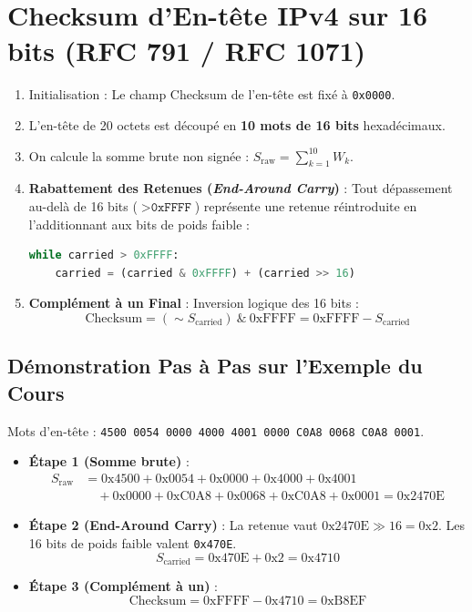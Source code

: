 \documentclass[11pt,a4paper]{report}
\begin{document}
\section{Checksum d'En-t\^ete IPv4 sur 16 bits (RFC 791 / RFC 1071)}
\begin{enumerate}
    \item Initialisation : Le champ Checksum de l'en-t\^ete est fix\'e \`a \texttt{0x0000}.
    \item L'en-t\^ete de 20 octets est d\'ecoup\'e en \textbf{10 mots de 16 bits} hexad\'ecimaux.
    \item On calcule la somme brute non sign\'ee : $S_{\text{raw}} = \sum_{k=1}^{10} W_k$.
    \item \textbf{Rabattement des Retenues (\textit{End-Around Carry})} : Tout d\'epassement au-del\`a de 16 bits ($> \texttt{0xFFFF}$) repr\'esente une retenue r\'eintroduite en l'additionnant aux bits de poids faible :
    \begin{lstlisting}[language=Python]
while carried > 0xFFFF:
    carried = (carried & 0xFFFF) + (carried >> 16)
    \end{lstlisting}
    \item \textbf{Compl\'ement \`a un Final} : Inversion logique des 16 bits :
    $$\text{Checksum} = (\sim S_{\text{carried}}) \ \& \ \text{0xFFFF} = \text{0xFFFF} - S_{\text{carried}}$$
\end{enumerate}

\subsection{D\'emonstration Pas \`a Pas sur l'Exemple du Cours}
Mots d'en-t\^ete : \texttt{4500 0054 0000 4000 4001 0000 C0A8 0068 C0A8 0001}.
\begin{itemize}
    \item \textbf{\'Etape 1 (Somme brute)} :
    \begin{align*}
        S_{\text{raw}} &= \text{0x4500} + \text{0x0054} + \text{0x0000} + \text{0x4000} + \text{0x4001} \\
        &\quad {} + \text{0x0000} + \text{0xC0A8} + \text{0x0068} + \text{0xC0A8} + \text{0x0001} = \text{0x2470E}
    \end{align*}
    \item \textbf{\'Etape 2 (End-Around Carry)} :
    La retenue vaut $\text{0x2470E} \gg 16 = \text{0x2}$. Les 16 bits de poids faible valent \texttt{0x470E}.
    $$S_{\text{carried}} = \text{0x470E} + \text{0x2} = \text{0x4710}$$
    \item \textbf{\'Etape 3 (Compl\'ement \`a un)} :
    $$\text{Checksum} = \text{0xFFFF} - \text{0x4710} = \text{0xB8EF}$$
\end{itemize}
\end{document}
